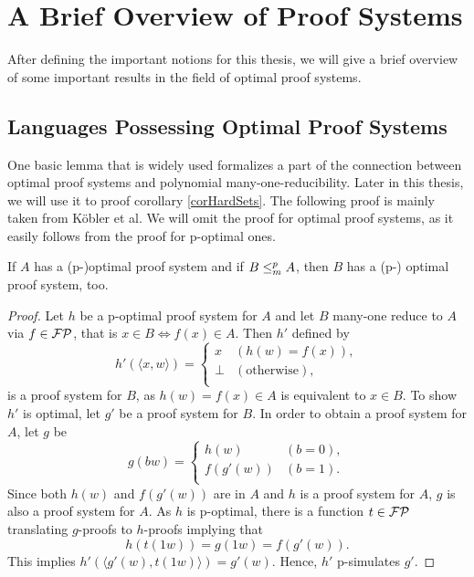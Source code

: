 \chapter{A Brief Overview of Proof Systems} \label{chpOverview}
  After defining the important notions for this thesis, we will give a brief overview of some important results in the field of optimal proof systems.
  
  \section{Languages Possessing Optimal Proof Systems}
  
  One basic lemma that is widely used formalizes a part of the connection between optimal proof systems and polynomial many-one-reducibility. Later in this thesis, we will use it to proof corollary \ref{corHardSets}. The following proof is mainly taken from Köbler et al. We will omit the proof for optimal proof systems, as it easily follows from the proof for p-optimal ones.

  \begin{lemma} \label{lemManyOneProofSystem}
    If \(A\) has a (p-)optimal proof system and if \(B \leq_{m}^{p} A\), then \(B\) has a (p-) optimal proof system, too.
  \end{lemma}

  \begin{proof}
    Let \(h\) be a p-optimal proof system for \(A\) and let \(B\) many-one reduce to \(A\) via \(f \in \mathcal{FP}\), that is \(x \in B \Leftrightarrow f(x) \in A\). Then \(h'\) defined by
      \[
        h'(\langle x, w \rangle) =
        \begin{cases}
          x & (h(w) = f(x)), \\
          \perp & (\text{otherwise}), \\
        \end{cases}
      \]
    is a proof system for \(B\), as \(h(w) = f(x) \in A\) is equivalent to \(x \in B\). To show \(h'\) is optimal, let \(g'\) be a proof system for \(B\). In order to obtain a proof system for \(A\), let \(g\) be
      \[
        g(bw) =
        \begin{cases}
          h(w) & (b = 0), \\
          f(g'(w)) & (b = 1). \\
        \end{cases}
      \]
    Since both \(h(w)\) and \(f(g'(w))\) are in \(A\) and \(h\) is a proof system for \(A\), \(g\) is also a proof system for \(A\). As \(h\) is p-optimal, there is a function \(t \in \mathcal{FP}\) translating \(g\)-proofs to \(h\)-proofs implying that
    \[
      h(t(1w)) = g(1w) = f(g'(w)).
    \]
    This implies \(h'(\langle g'(w), t(1w) \rangle ) = g'(w)\). Hence, \(h'\) p-simulates \(g'\).
  \end{proof}

